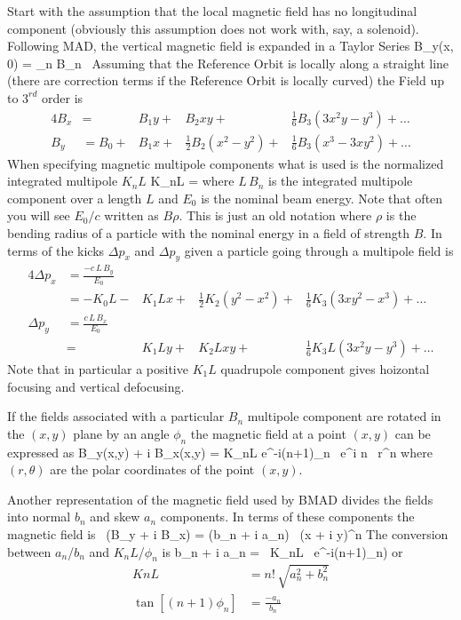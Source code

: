 Start with the assumption that the local magnetic field has no
longitudinal component (obviously this assumption does not work with,
say, a solenoid).  Following MAD, the vertical magnetic field is
expanded in a Taylor Series
\Begineq
  B_y(x, 0) = \sum_n B_n \, 
\Endeq
Assuming that the Reference Orbit is locally along a straight line
(there are correction terms if the Reference Orbit is locally curved) the 
Field up to $3^{rd}$ order is
\begin{alignat}{4}
  B_x &=        &B_1 y + &B_2 xy + & \frac{1}{6} B_3 (3x^2 y - y^3) + \ldots \\
  B_y &= B_0 +  &B_1 x + & \frac{1}{2} B_2 (x^2 - y^2) + 
                                   & \frac{1}{6} B_3 (x^3 - 3x y^2) + \ldots
\end{alignat}
When specifying magnetic multipole components what is used is the
normalized integrated multipole $K_nL$
\Begineq
  K_nL = 
\Endeq
where $L \, B_n$ is the integrated multipole component over a length
$L$ and $E_0$ is the nominal beam energy. Note that often you will see
$E_0/c$ written as $B\rho$. This is just an old notation where $\rho$
is the bending radius of a particle with the nominal energy in a field
of strength $B$. In terms of the kicks $\Delta p_x$ and $\Delta p_y$
given a particle going through a multipole field is
\begin{alignat}{4}
  \Delta p_x &= \frac{-c\, L \, B_y}{E_0} \\
             &= -K_0L - &K_1L x + & \frac{1}{2} K_2 (y^2 - x^2) + 
                                & \frac{1}{6} K_3 (3x y^2 - x^3) + \ldots \\
  \Delta p_y &= \frac{c\, L \, B_x}{E_0} \\
             &=        &K_1L y + &K_2L xy + 
                                & \frac{1}{6} K_3L (3x^2 y - y^3) + \ldots 
\end{alignat}
Note that in particular a positive $K_1L$ quadrupole component gives
hoizontal focusing and vertical defocusing. 

If the fields associated with a particular $B_n$ multipole component
are rotated in the $(x, y)$ plane by an angle $\phi_n$ the magnetic
field at a point $(x,y)$ can be expressed as
\Begineq
  B_y(x,y) + i B_x(x,y) = 
                 K_nL e^{-i(n+1)\phi_n} \, e^{i n \theta} \, r^n 
\Endeq
where $(r, \theta)$ are the polar coordinates of the point $(x, y)$.

Another representation of the magnetic field used by BMAD divides the
fields into normal $b_n$ and skew $a_n$ components. In terms of these
components the magnetic field is
\Begineq
   \, (B_y + i B_x) = (b_n + i a_n) \, (x + i y)^n
\Endeq
The conversion between $a_n$/$b_n$ and $K_nL$/$\phi_n$ is
\Begineq
  b_n + i a_n =  \, K_nL \, e^{-i(n+1)\phi_n)}
\Endeq
or
\begin{align}
  KnL &= n! \, \sqrt{a_n^2 + b_n^2} \\
  \tan[(n+1) \phi_n] &= \frac{-a_n}{b_n}
\end{align}


